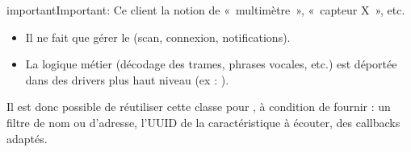 \documentclass[letterpaper,10pt,french]{sphinxmanual}
\begin{document}
\begin{sphinxadmonition}{important}{Important:}
\sphinxAtStartPar
Ce client  la notion de « multimètre », « capteur X », etc.
\begin{itemize}
\item {} 
\sphinxAtStartPar
Il ne fait que gérer le  (scan, connexion, notifications).

\item {} 
\sphinxAtStartPar
La logique métier (décodage des trames, phrases vocales, etc.)
est déportée dans des drivers plus haut niveau (ex : ).

\end{itemize}

\sphinxAtStartPar
Il est donc possible de réutiliser cette classe pour , à condition de fournir :
\sphinxhyphen{} un filtre de nom ou d’adresse,
\sphinxhyphen{} l’UUID de la caractéristique à écouter,
\sphinxhyphen{} des callbacks adaptés.
\end{sphinxadmonition}
\end{document}
